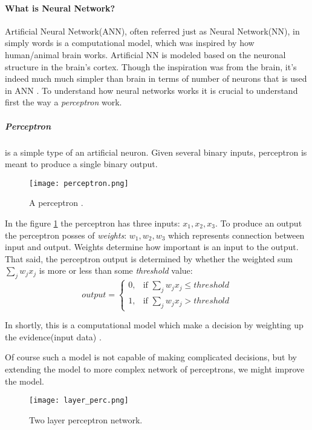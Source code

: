\paragraph{What is Neural Network?}
Artificial Neural Network(ANN), often referred just as Neural Network(NN),
in simply words is a computational model, which was inspired by how human/animal
brain works. Artificial NN is modeled based on the neuronal structure in the brain's
cortex. Though the inspiration was from the brain,
it's indeed much much simpler than brain in terms of number of neurons that is used
in ANN \cite{Goodfellow-et-al-2016}.
To understand how neural networks works it is crucial to understand first the
way a \emph{perceptron} work.
\subparagraph{Perceptron} is a simple type of an artificial neuron.
Given several binary inputs, perceptron is meant to produce a single binary output.
\begin{figure}[H]
	\texttt{[image: perceptron.png]}
	\caption{A perceptron \cite{Nielsen2015}.} %
	\label{img:model} %
\end{figure}
In the figure \ref{img:model} the perceptron has three inputs: $x_1, x_2, x_3$.
To produce an output the perceptron posses of \emph{weights}: $w_1, w_2, w_3$ which represents
connection between input and output. Weights determine how important is an input to the output.
That said, the perceptron output is determined by whether the weighted sum $\sum_j w_j x_j$ is more or less
than some \emph{threshold} value:
\begin{equation} \label{perc:out}
	output = \begin{cases} 0, & \mbox{if } \sum_j w_j x_j \leq threshold \\ 1, & \mbox{if } \sum_j w_j x_j > threshold \end{cases}
\end{equation}

In shortly, this is a computational model which make a decision by weighting up
the evidence(input data) \cite{rosenblatt1962principles}.

Of course such a model is not capable of making complicated decisions, but
by extending the model to more complex network of perceptrons, we might improve the model.

\begin{figure}[H]
	\texttt{[image: layer\_perc.png]}
	\caption{Two layer perceptron network\cite{Nielsen2015}.} %
	\label{img:layer_perc} %
\end{figure}

